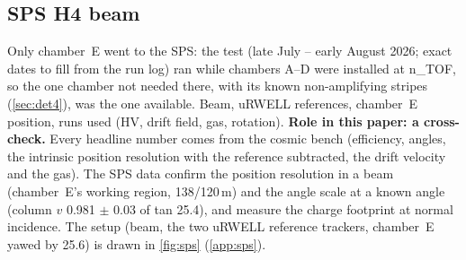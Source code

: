 \subsection{SPS H4 beam}
Only chamber~E went to the SPS: the test (late July -- early August 2026; exact dates to fill from the run log) ran while chambers A--D were installed at
n\_TOF, so the one chamber not needed there, with its known non-amplifying stripes (\cref{sec:det4}), was the one
available. Beam, uRWELL references, chamber~E position, runs used (HV, drift field, gas, rotation).
\textbf{Role in this paper: a cross-check.} Every headline number comes from the cosmic bench (efficiency, angles,
the intrinsic position resolution with the reference subtracted, the drift velocity and the gas). The SPS data confirm
the position resolution in a beam (chamber~E's working region, 138/120\,\textmu m) and the angle scale at a known angle
(column $v$ 0.981 $\pm$ 0.03 of tan 25.4\textdegree), and measure the charge footprint at normal incidence.
The setup (beam, the two uRWELL reference trackers, chamber~E yawed by 25.6\textdegree{}) is drawn in \cref{fig:sps} (\cref{app:sps}).

